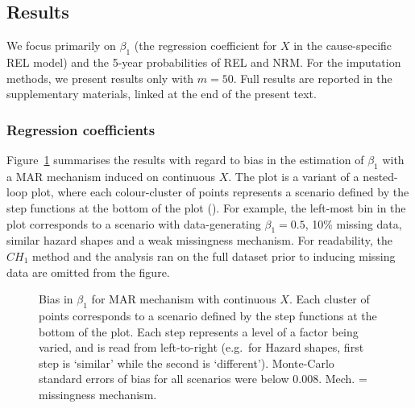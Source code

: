 \documentclass[
  letterpaper,
  DIV=11,
  numbers=noendperiod]{scrreprt}
\begin{document}
\subsection{Results}\label{results-1}

We focus primarily on \(\beta_1\) (the regression coefficient for \(X\)
in the cause-specific REL model) and the 5-year probabilities of REL and
NRM. For the imputation methods, we present results only with
\(m = 50\). Full results are reported in the supplementary materials,
linked at the end of the present text.

\subsubsection{Regression coefficients}\label{regression-coefficients-1}

Figure~\ref{fig-beta1-MAR} summarises the results with regard to bias in
the estimation of \(\beta_1\) with a MAR mechanism induced on continuous
\(X\). The plot is a variant of a nested-loop plot, where each
colour-cluster of points represents a scenario defined by the step
functions at the bottom of the plot
(). For example, the left-most bin in the plot
corresponds to a scenario with data-generating \(\beta_1 = 0.5\), 10\%
missing data, similar hazard shapes and a weak missingness mechanism.
For readability, the \(CH_{1}\) method and the analysis ran on the full
dataset prior to inducing missing data are omitted from the figure.

\begin{figure}


\caption{\label{fig-beta1-MAR}Bias in \(\beta_1\) for MAR mechanism with
continuous \(X\). Each cluster of points corresponds to a scenario
defined by the step functions at the bottom of the plot. Each step
represents a level of a factor being varied, and is read from
left-to-right (e.g.~for Hazard shapes, first step is `similar' while the
second is `different'). Monte-Carlo standard errors of bias for all
scenarios were below 0.008. Mech. = missingness mechanism.}

\end{figure}%
\end{document}
